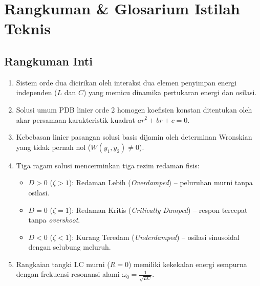 \documentclass[11pt,a4paper]{article}
\theoremstyle{definition}
\begin{document}
\section{Rangkuman \& Glosarium Istilah Teknis}

\subsection{Rangkuman Inti}
\begin{enumerate}[leftmargin=*]
    \item Sistem orde dua dicirikan oleh interaksi dua elemen penyimpan energi independen ($L$ dan $C$) yang memicu dinamika pertukaran energi dan osilasi.
    \item Solusi umum PDB linier orde 2 homogen koefisien konstan ditentukan oleh akar persamaan karakteristik kuadrat $a r^2 + b r + c = 0$.
    \item Kebebasan linier pasangan solusi basis dijamin oleh determinan Wronskian yang tidak pernah nol ($W(y_1, y_2) \neq 0$).
    \item Tiga ragam solusi mencerminkan tiga rezim redaman fisis:
    \begin{itemize}
        \item $D > 0$ ($\zeta > 1$): Redaman Lebih (\textit{Overdamped}) -- peluruhan murni tanpa osilasi.
        \item $D = 0$ ($\zeta = 1$): Redaman Kritis (\textit{Critically Damped}) -- respon tercepat tanpa \textit{overshoot}.
        \item $D < 0$ ($\zeta < 1$): Kurang Teredam (\textit{Underdamped}) -- osilasi sinusoidal dengan selubung meluruh.
    \end{itemize}
    \item Rangkaian tangki LC murni ($R = 0$) memiliki kekekalan energi sempurna dengan frekuensi resonansi alami $\omega_0 = \frac{1}{\sqrt{LC}}$.
\end{enumerate}
\end{document}
